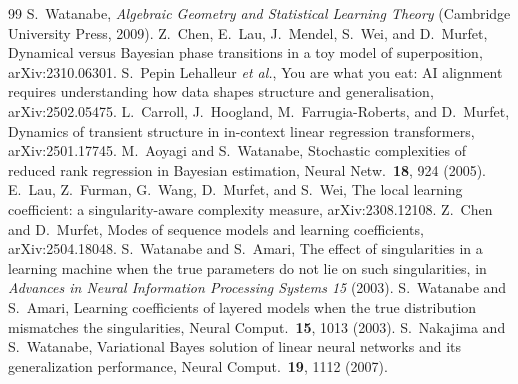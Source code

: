 \documentclass[11pt]{article}
\begin{document}
\begin{thebibliography}{99}
 S.~Watanabe, \emph{Algebraic Geometry and Statistical Learning Theory} (Cambridge University Press, 2009).
 Z.~Chen, E.~Lau, J.~Mendel, S.~Wei, and D.~Murfet, Dynamical versus Bayesian phase transitions in a toy model of superposition, arXiv:2310.06301.
 S.~Pepin Lehalleur \emph{et al.}, You are what you eat: AI alignment requires understanding how data shapes structure and generalisation, arXiv:2502.05475.
 L.~Carroll, J.~Hoogland, M.~Farrugia-Roberts, and D.~Murfet, Dynamics of transient structure in in-context linear regression transformers, arXiv:2501.17745.
 M.~Aoyagi and S.~Watanabe, Stochastic complexities of reduced rank regression in Bayesian estimation, Neural Netw.\ \textbf{18}, 924 (2005).
 E.~Lau, Z.~Furman, G.~Wang, D.~Murfet, and S.~Wei, The local learning coefficient: a singularity-aware complexity measure, arXiv:2308.12108.
 Z.~Chen and D.~Murfet, Modes of sequence models and learning coefficients, arXiv:2504.18048.
 S.~Watanabe and S.~Amari, The effect of singularities in a learning machine when the true parameters do not lie on such singularities, in \emph{Advances in Neural Information Processing Systems 15} (2003).
 S.~Watanabe and S.~Amari, Learning coefficients of layered models when the true distribution mismatches the singularities, Neural Comput.\ \textbf{15}, 1013 (2003).
 S.~Nakajima and S.~Watanabe, Variational Bayes solution of linear neural networks and its generalization performance, Neural Comput.\ \textbf{19}, 1112 (2007).
\end{thebibliography}
\end{document}
